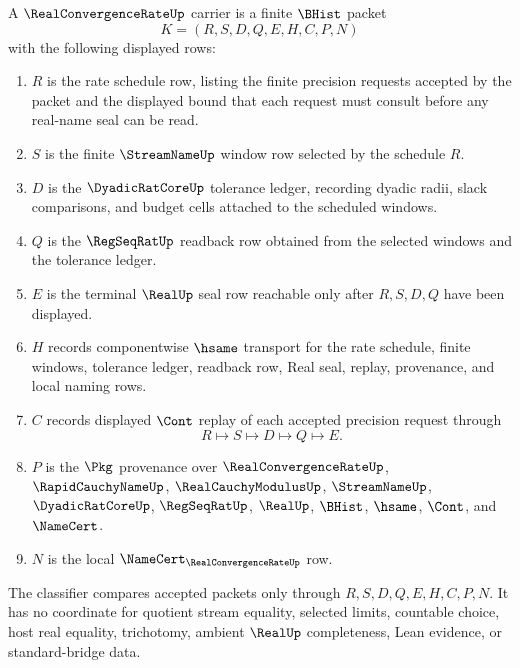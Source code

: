 \begin{definition}
\label{def:real-convergence-rate-carrier}
A $\RealConvergenceRateUp$ carrier is a finite $\BHist$ packet
$$
K=(R,S,D,Q,E,H,C,P,N)
$$
with the following displayed rows:
\begin{enumerate}
\item $R$ is the rate schedule row, listing the finite precision requests accepted by the packet and the displayed bound that each request must consult before any real-name seal can be read.
\item $S$ is the finite $\StreamNameUp$ window row selected by the schedule $R$.
\item $D$ is the $\DyadicRatCoreUp$ tolerance ledger, recording dyadic radii, slack comparisons, and budget cells attached to the scheduled windows.
\item $Q$ is the $\RegSeqRatUp$ readback row obtained from the selected windows and the tolerance ledger.
\item $E$ is the terminal $\RealUp$ seal row reachable only after $R,S,D,Q$ have been displayed.
\item $H$ records componentwise $\hsame$ transport for the rate schedule, finite windows, tolerance ledger, readback row, Real seal, replay, provenance, and local naming rows.
\item $C$ records displayed $\Cont$ replay of each accepted precision request through
$$
R\longmapsto S\longmapsto D\longmapsto Q\longmapsto E .
$$
\item $P$ is the $\Pkg$ provenance over $\RealConvergenceRateUp$, $\RapidCauchyNameUp$, $\RealCauchyModulusUp$, $\StreamNameUp$, $\DyadicRatCoreUp$, $\RegSeqRatUp$, $\RealUp$, $\BHist$, $\hsame$, $\Cont$, and $\NameCert$.
\item $N$ is the local $\NameCert_{\RealConvergenceRateUp}$ row.
\end{enumerate}
The classifier compares accepted packets only through $R,S,D,Q,E,H,C,P,N$. It has no coordinate for quotient stream equality, selected limits, countable choice, host real equality, trichotomy, ambient $\RealUp$ completeness, Lean evidence, or standard-bridge data.
\end{definition}

